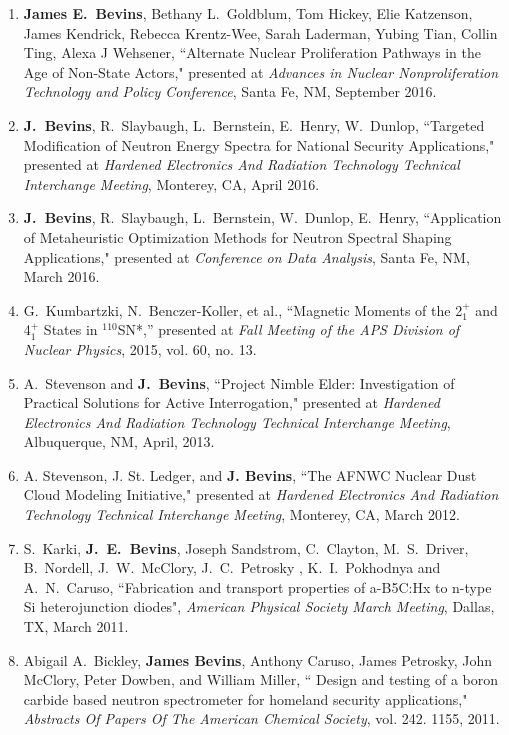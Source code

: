 \begin{enumerate}
  \item \textbf{James E.\ Bevins}, Bethany L.\ Goldblum, Tom Hickey, Elie Katzenson, James Kendrick, Rebecca Krentz-Wee, Sarah Laderman, Yubing Tian, Collin Ting, Alexa J Wehsener, ``Alternate Nuclear Proliferation Pathways in the Age of Non-State Actors," presented at \textit{Advances in Nuclear Nonproliferation Technology and Policy Conference}, Santa Fe, NM, September 2016.

  \item \textbf{J.\ Bevins}, R.\ Slaybaugh, L.\ Bernstein, E.\ Henry, W.\ Dunlop, ``Targeted Modification of Neutron Energy Spectra for National Security Applications," presented at \textit{Hardened Electronics And Radiation Technology Technical Interchange Meeting}, Monterey, CA, April 2016. 

  \item \textbf{J.\ Bevins}, R.\ Slaybaugh, L.\ Bernstein, W.\ Dunlop, E.\ Henry, ``Application of Metaheuristic Optimization Methods for Neutron Spectral Shaping Applications," presented at \textit{Conference on Data Analysis}, Santa Fe, NM, March 2016.
  
  \item G.\ Kumbartzki, N.\ Benczer-Koller, et al., ``Magnetic Moments of the 2$^+_1$ and 4$^+_1$ States in $^{110}$SN*,” presented at \textit{Fall Meeting of the APS Division of Nuclear Physics}, 2015, vol. 60, no. 13.
  
  \item A.\ Stevenson and \textbf{J.\ Bevins}, ``Project Nimble Elder: Investigation of Practical Solutions for Active Interrogation," presented at \textit{Hardened Electronics And Radiation Technology Technical Interchange Meeting}, Albuquerque, NM, April, 2013.
  
  \item A. Stevenson, J. St. Ledger, and \textbf{J. Bevins}, ``The AFNWC Nuclear Dust Cloud Modeling Initiative," presented at \textit{Hardened Electronics And Radiation Technology Technical Interchange Meeting}, Monterey, CA, March 2012.

  \item S.\ Karki, \textbf{J.\ E.\ Bevins}, Joseph Sandstrom, C.\ Clayton, M.\ S.\ Driver, B.\ Nordell, J.\ W.\ McClory, J.\ C.\ Petrosky , K.\ I.\ Pokhodnya and A.\ N.\ Caruso, ``Fabrication and transport properties of a-B5C:Hx to n-type Si heterojunction diodes", \textit{American Physical Society March Meeting}, Dallas, TX, March 2011. 
  
  \item Abigail A.\ Bickley, \textbf{James Bevins}, Anthony Caruso, James Petrosky, John McClory, Peter Dowben, and William Miller, `` Design and testing of a boron carbide based neutron spectrometer for homeland security applications," \textit{Abstracts Of Papers Of The American Chemical Society}, vol. 242. 1155, 2011.


\end{enumerate}

